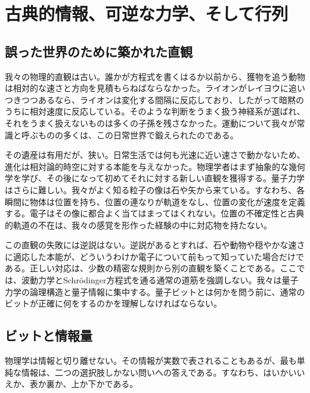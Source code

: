 \chapter{古典的情報、可逆な力学、そして行列}


\section{誤った世界のために築かれた直観}

我々の物理的直観は古い。誰かが方程式を書くはるか以前から、獲物を追う動物は相対的な速さと方向を見積もらねばならなかった。ライオンがレイヨウに追いつきつつあるなら、ライオンは変化する間隔に反応しており、したがって暗黙のうちに相対速度に反応している。そのような判断をうまく扱う神経系が選ばれ、それをうまく扱えないものは多くの子孫を残さなかった。運動について我々が常識と呼ぶものの多くは、この日常世界で鍛えられたのである。

その遺産は有用だが、狭い。日常生活では何も光速に近い速さで動かないため、進化は相対論的時空に対する本能を与えなかった。物理学者はまず抽象的な幾何学を学び、その後になって初めてそれに対する新しい直観を獲得する。量子力学はさらに難しい。我々がよく知る粒子の像は石や矢から来ている。すなわち、各瞬間に物体は位置を持ち、位置の連なりが軌道をなし、位置の変化が速度を定義する。電子はその像に都合よく当てはまってはくれない。位置の不確定性と古典的軌道の不在は、我々の感覚を形作った経験の中に対応物を持たない。

この直観の失敗には逆説はない。逆説があるとすれば、石や動物や穏やかな速さに適応した本能が、どういうわけか電子について前もって知っていた場合だけである。正しい対応は、少数の精密な規則から別の直観を築くことである。ここでは、波動力学とSchr\"odinger方程式を通る通常の道筋を強調しない。我々は量子力学の論理構造と量子情報に集中する。量子ビットとは何かを問う前に、通常のビットが正確に何をするのかを理解しなければならない。

\section{ビットと情報量}

物理学は情報と切り離せない。その情報が実数で表されることもあるが、最も単純な情報は、二つの選択肢しかない問いへの答えである。すなわち、はいかいいえか、表か裏か、上か下かである。


